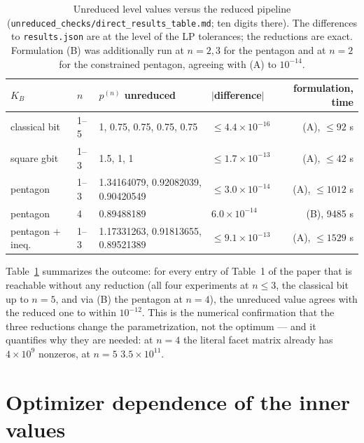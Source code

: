 \documentclass[11pt,a4paper]{article}
\newcommand*{\code}[1]{\texttt{#1}}
\theoremstyle{remark}
\begin{document}
\begin{table}[ht]\centering\small
\begin{tabular}{@{}llllr@{}}
\toprule
$K_B$ & $n$ & $p^{(n)}$ unreduced & $|$difference$|$ & formulation, time\\
\midrule
classical bit & 1--5 & 1, 0.75, 0.75, 0.75, 0.75 & $\leq 4.4\times10^{-16}$ & (A), $\leq 92$ s\\
square gbit & 1--3 & 1.5, 1, 1 & $\leq 1.7\times10^{-13}$ & (A), $\leq 42$ s\\
pentagon & 1--3 & 1.34164079, 0.92082039, 0.90420549 & $\leq 3.0\times10^{-14}$ & (A), $\leq 1012$ s\\
pentagon & 4 & 0.89488189 & $6.0\times10^{-14}$ & (B), 9485 s\\
pentagon + ineq. & 1--3 & 1.17331263, 0.91813655, 0.89521389 & $\leq 9.1\times10^{-13}$ & (A), $\leq 1529$ s\\
\bottomrule
\end{tabular}
\caption{Unreduced level values versus the reduced pipeline
(\code{unreduced\_checks/direct\_results\_table.md}; ten digits there). The
differences to \code{results.json} are at the level of the LP tolerances;
the reductions are exact. Formulation (B)
was additionally run at $n=2,3$ for the pentagon and at $n=2$ for the
constrained pentagon, agreeing with (A) to $10^{-14}$.}
\label{tab:unreduced}
\end{table}

Table~\ref{tab:unreduced} summarizes the outcome: for every entry of
Table~1 of the paper that is reachable without any reduction (all four
experiments at $n\leq 3$, the classical bit up to $n=5$, and via (B) the
pentagon at $n=4$), the unreduced value agrees with the reduced one to
within $10^{-12}$. This is the numerical confirmation that the three
reductions change the parametrization, not the optimum --- and it
quantifies why they are needed: at $n=4$ the literal facet matrix already
has $4\times 10^9$ nonzeros, at $n=5$ $3.5\times 10^{11}$.

\section{Optimizer dependence of the inner values}\label{sec:sensitivity}
\end{document}
